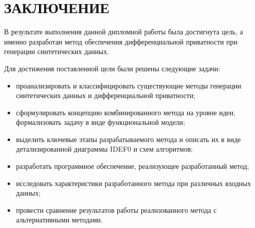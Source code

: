 
\chapter*{ЗАКЛЮЧЕНИЕ}

В результате выполнения данной дипломной работы была достигнута цель, а именно разработан метод обеспечения дифференциальной приватности при генерации синтетических данных. 

Для достижения поставленной цели были решены  следующие задачи:
\begin{itemize}[label=---]
	\item проанализировать и классифицировать существующие методы генерации синтетических данных и дифференциальной приватности;
	\item сформулировать концепцию комбинированного метода на уровне идеи, формализовать задачу в виде функциональной модели;
	\item выделить ключевые этапы разрабатываемого метода и описать их в виде детализированной диаграммы IDEF0 и схем алгоритмов;
	\item разработать программное обеспечение, реализующее разработанный метод;
	\item исследовать характеристики разработанного метода при различных входных
	данных;
	\item провести сравнение результатов работы реализованного метода с альтернативными методами.
	
\end{itemize}

